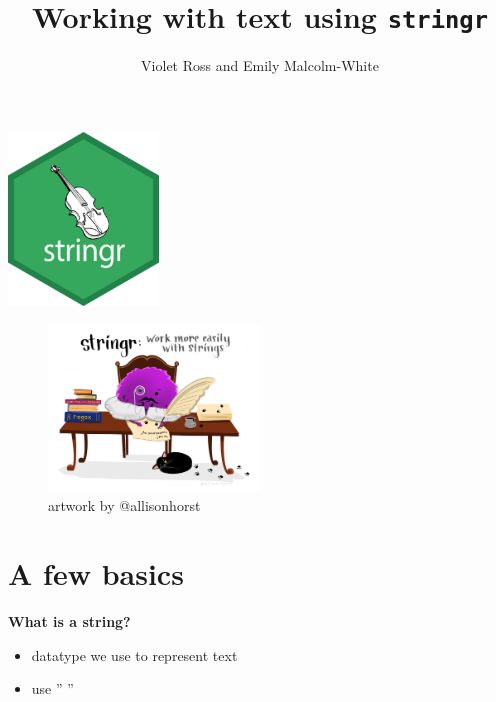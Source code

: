 \documentclass[
  letterpaper,
  DIV=11,
  numbers=noendperiod]{scrartcl}
\title{Working with text using \texttt{stringr}}
\author{Violet Ross and Emily Malcolm-White}
\date{}
\providecommand{\tightlist}{%
  \setlength{\itemsep}{0pt}\setlength{\parskip}{0pt}}\usepackage{longtable,booktabs,array}
\begin{document}
\maketitle
\ifdefined\Shaded\renewenvironment{Shaded}{\begin{tcolorbox}[breakable, boxrule=0pt, interior hidden, sharp corners, borderline west={3pt}{0pt}{shadecolor}, frame hidden, enhanced]}{\end{tcolorbox}}\fi

\includegraphics[width=0.3\textwidth,height=\textheight]{118_stringr_files/mediabag/logo.png}

\begin{figure}

{\centering \includegraphics[width=0.5\textwidth,height=\textheight]{118_stringr_files/mediabag/6bbcc35c-1863-49df-8.png}

}

\caption{artwork by @allisonhorst}

\end{figure}

\hypertarget{a-few-basics}{%
\section{A few basics}\label{a-few-basics}}

\textbf{What is a string?}

\begin{itemize}
\tightlist
\item
  datatype we use to represent text
\item
  use '' ''
\end{itemize}
\end{document}
